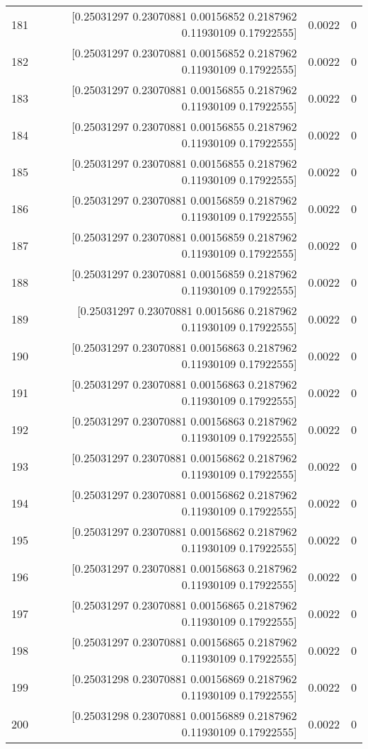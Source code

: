 \begin{longtable}{lrrr}
181 & [0.25031297 0.23070881 0.00156852 0.2187962  0.11930109 0.17922555] & 0.0022 & 0 \\
182 & [0.25031297 0.23070881 0.00156852 0.2187962  0.11930109 0.17922555] & 0.0022 & 0 \\
183 & [0.25031297 0.23070881 0.00156855 0.2187962  0.11930109 0.17922555] & 0.0022 & 0 \\
184 & [0.25031297 0.23070881 0.00156855 0.2187962  0.11930109 0.17922555] & 0.0022 & 0 \\
185 & [0.25031297 0.23070881 0.00156855 0.2187962  0.11930109 0.17922555] & 0.0022 & 0 \\
186 & [0.25031297 0.23070881 0.00156859 0.2187962  0.11930109 0.17922555] & 0.0022 & 0 \\
187 & [0.25031297 0.23070881 0.00156859 0.2187962  0.11930109 0.17922555] & 0.0022 & 0 \\
188 & [0.25031297 0.23070881 0.00156859 0.2187962  0.11930109 0.17922555] & 0.0022 & 0 \\
189 & [0.25031297 0.23070881 0.0015686  0.2187962  0.11930109 0.17922555] & 0.0022 & 0 \\
190 & [0.25031297 0.23070881 0.00156863 0.2187962  0.11930109 0.17922555] & 0.0022 & 0 \\
191 & [0.25031297 0.23070881 0.00156863 0.2187962  0.11930109 0.17922555] & 0.0022 & 0 \\
192 & [0.25031297 0.23070881 0.00156863 0.2187962  0.11930109 0.17922555] & 0.0022 & 0 \\
193 & [0.25031297 0.23070881 0.00156862 0.2187962  0.11930109 0.17922555] & 0.0022 & 0 \\
194 & [0.25031297 0.23070881 0.00156862 0.2187962  0.11930109 0.17922555] & 0.0022 & 0 \\
195 & [0.25031297 0.23070881 0.00156862 0.2187962  0.11930109 0.17922555] & 0.0022 & 0 \\
196 & [0.25031297 0.23070881 0.00156863 0.2187962  0.11930109 0.17922555] & 0.0022 & 0 \\
197 & [0.25031297 0.23070881 0.00156865 0.2187962  0.11930109 0.17922555] & 0.0022 & 0 \\
198 & [0.25031297 0.23070881 0.00156865 0.2187962  0.11930109 0.17922555] & 0.0022 & 0 \\
199 & [0.25031298 0.23070881 0.00156869 0.2187962  0.11930109 0.17922555] & 0.0022 & 0 \\
200 & [0.25031298 0.23070881 0.00156889 0.2187962  0.11930109 0.17922555] & 0.0022 & 0 \\

\end{longtable}
